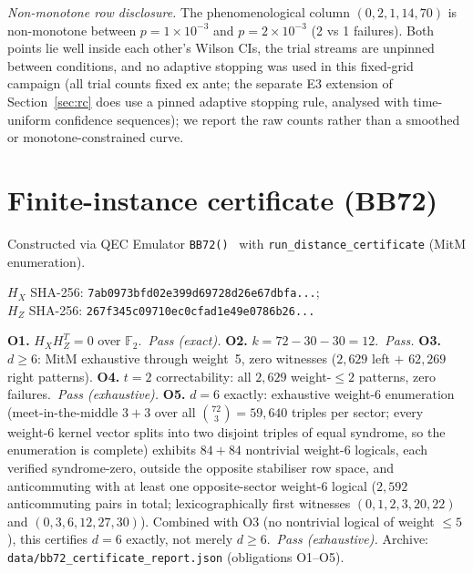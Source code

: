 \documentclass[11pt,a4paper]{article}
\begin{document}
\emph{Non-monotone row disclosure.} The phenomenological column
$(0,2,1,14,70)$ is non-monotone between $p=1\times10^{-3}$ and
$p=2\times10^{-3}$ (2 vs 1 failures). Both points lie well inside each
other's Wilson CIs, the trial streams are unpinned between conditions,
and no adaptive stopping was used in this fixed-grid campaign (all trial
counts fixed ex ante; the separate E3 extension of
Section~\ref{sec:rc} does use a pinned adaptive stopping rule, analysed
with time-uniform confidence sequences); we report the raw counts rather
than a smoothed or monotone-constrained curve.

\section{Finite-instance certificate (BB72)}
\label{sec:cert}

Constructed via QEC Emulator \texttt{BB72()}~\cite{AlDaajeh2026emulator}
with \texttt{run\_distance\_certificate} (MitM enumeration).

$H_X$ SHA-256: \texttt{7ab0973bfd02e399d69728d26e67dbfa...};\\
$H_Z$ SHA-256: \texttt{267f345c09710ec0cfad1e49e0786b26...}

\textbf{O1.} $H_XH_Z^T=0$ over $\mathbb{F}_2$.\ \textit{Pass (exact).}
\textbf{O2.} $k=72-30-30=12$.\ \textit{Pass.}
\textbf{O3.} $d\ge6$: MitM exhaustive through weight~5, zero witnesses
($2{,}629$ left $+$ $62{,}269$ right patterns).
\textbf{O4.} $t=2$ correctability: all $2{,}629$ weight-$\le2$ patterns,
zero failures.\ \textit{Pass (exhaustive).}
\textbf{O5.} $d=6$ exactly: exhaustive weight-6 enumeration
(meet-in-the-middle $3{+}3$ over all $\binom{72}{3}=59{,}640$ triples per
sector; every weight-6 kernel vector splits into two disjoint triples of
equal syndrome, so the enumeration is complete) exhibits $84+84$
nontrivial weight-6 logicals, each verified syndrome-zero, outside the
opposite stabiliser row space, and anticommuting with at least one
opposite-sector weight-6 logical ($2{,}592$ anticommuting pairs in total;
lexicographically first witnesses $(0,1,2,3,20,22)$ and $(0,3,6,12,27,30)$).
Combined with O3 (no nontrivial logical of weight $\le5$), this certifies
$d=6$ exactly, not merely $d\ge6$.\ \textit{Pass (exhaustive).}
Archive: \texttt{data/bb72\_certificate\_report.json} (obligations O1--O5).
\end{document}
